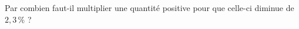 
Par combien faut-il multiplier une quantité positive pour que celle-ci diminue de $2{,}3\,\%$ ?

\smallskip

